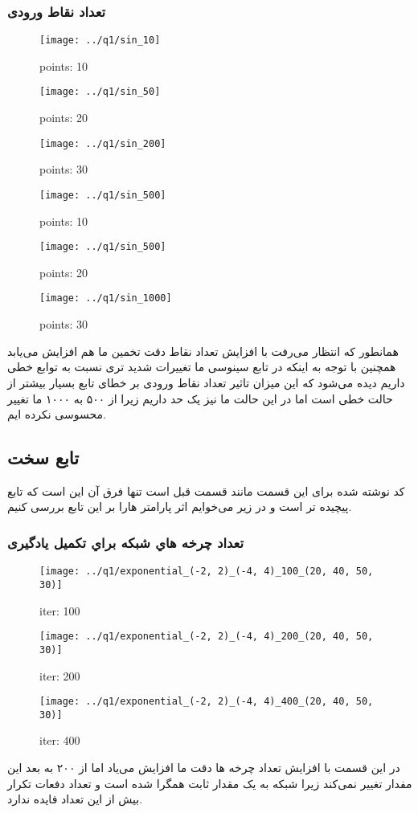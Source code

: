\documentclass[a4paper,12pt]{article}
\begin{document}
\subsubsection{تعداد نقاط ورودی}



\begin{figure}[!htb]
  \texttt{[image: ../q1/sin\_10]}
  \caption{points: 10}
\endminipage\hfill
{}
  \texttt{[image: ../q1/sin\_50]}
  \caption{points: 20}
\endminipage\hfill
{}
  \texttt{[image: ../q1/sin\_200]}
  \caption{points: 30}
\endminipage
\end{figure}

\begin{figure}[!htb]
  \texttt{[image: ../q1/sin\_500]}
  \caption{points: 10}
\endminipage\hfill
{}
  \texttt{[image: ../q1/sin\_500]}
  \caption{points: 20}
\endminipage\hfill
{}
  \texttt{[image: ../q1/sin\_1000]}
  \caption{points: 30}
\endminipage
\end{figure}
همانطور که انتظار می‌رفت با افزایش تعداد نقاط دقت تخمین ما هم افزایش می‌یابد همچنین با توجه به اینکه در تابع سینوسی ما تغییرات شدید تری نسبت به توابع خطی داریم دیده می‌شود که این میزان تاثیر تعداد نقاط ورودی بر خطای تابع بسیار بیشتر از حالت خطی است اما در این حالت ما نیز یک حد داریم زیرا از ۵۰۰ به ۱۰۰۰ ما تغییر محسوسی نکرده ایم.








\newpage
\subsection{تابع سخت}
کد نوشته شده برای این قسمت مانند قسمت قبل است تنها فرق آن این است که تابع پیچیده تر است و در زیر می‌خوایم اثر پارامتر هارا بر این تابع بررسی کنیم.

\subsubsection{تعداد چرخه هاي شبکه براي تکمیل یادگیری}

\begin{figure}[!htb]
  \texttt{[image: ../q1/exponential\_(-2, 2)\_(-4, 4)\_100\_(20, 40, 50, 30)]}
  \caption{iter: 100}
\endminipage\hfill
{}
  \texttt{[image: ../q1/exponential\_(-2, 2)\_(-4, 4)\_200\_(20, 40, 50, 30)]}
  \caption{iter: 200}
\endminipage\hfill
{}
  \texttt{[image: ../q1/exponential\_(-2, 2)\_(-4, 4)\_400\_(20, 40, 50, 30)]}
  \caption{iter: 400}
\endminipage
\end{figure}
در این قسمت با افزایش تعداد چرخه ها دقت ما افزایش می‌یاد اما از ۲۰۰ به بعد این مفدار تغییر نمی‌کند زیرا شبکه به یک مقدار ثابت همگرا شده است و تعداد دفعات تکرار بیش از این تعداد فایده ندارد.
\end{document}
